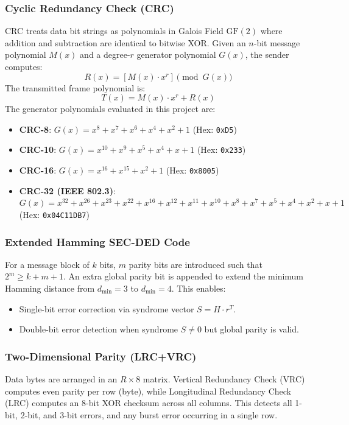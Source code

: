 \documentclass[12pt, a4paper]{article}
\begin{document}
\subsubsection{Cyclic Redundancy Check (CRC)}
CRC treats data bit strings as polynomials in Galois Field $\text{GF}(2)$ where addition and subtraction are identical to bitwise XOR. Given an $n$-bit message polynomial $M(x)$ and a degree-$r$ generator polynomial $G(x)$, the sender computes:
\begin{equation}
    R(x) = [M(x) \cdot x^r] \pmod{G(x)}
\end{equation}
The transmitted frame polynomial is:
\begin{equation}
    T(x) = M(x) \cdot x^r + R(x)
\end{equation}
The generator polynomials evaluated in this project are:
\begin{itemize}
    \item \textbf{CRC-8}: $G(x) = x^8 + x^7 + x^6 + x^4 + x^2 + 1$ (Hex: \texttt{0xD5})
    \item \textbf{CRC-10}: $G(x) = x^{10} + x^9 + x^5 + x^4 + x + 1$ (Hex: \texttt{0x233})
    \item \textbf{CRC-16}: $G(x) = x^{16} + x^{15} + x^2 + 1$ (Hex: \texttt{0x8005})
    \item \textbf{CRC-32 (IEEE 802.3)}: $G(x) = x^{32} + x^{26} + x^{23} + x^{22} + x^{16} + x^{12} + x^{11} + x^{10} + x^8 + x^7 + x^5 + x^4 + x^2 + x + 1$ (Hex: \texttt{0x04C11DB7})
\end{itemize}

\subsubsection{Extended Hamming SEC-DED Code}
For a message block of $k$ bits, $m$ parity bits are introduced such that $2^m \ge k + m + 1$. An extra global parity bit is appended to extend the minimum Hamming distance from $d_{\min} = 3$ to $d_{\min} = 4$. This enables:
\begin{itemize}
    \item Single-bit error correction via syndrome vector $S = H \cdot r^T$.
    \item Double-bit error detection when syndrome $S \neq 0$ but global parity is valid.
\end{itemize}

\subsubsection{Two-Dimensional Parity (LRC+VRC)}
Data bytes are arranged in an $R \times 8$ matrix. Vertical Redundancy Check (VRC) computes even parity per row (byte), while Longitudinal Redundancy Check (LRC) computes an 8-bit XOR checksum across all columns. This detects all 1-bit, 2-bit, and 3-bit errors, and any burst error occurring in a single row.
\end{document}
